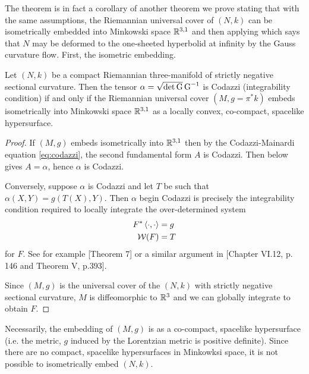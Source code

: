 \documentclass[a4paper, 12pt]{amsart}
\begin{document}
The theorem is in fact a corollary of another theorem we prove stating that with the same assumptions, the Riemannian universal cover of \((N, k)\) can be isometrically embedded into Minkowski space \(\mathbb{R}^{3,1}\) and then applying \cite[Theorem 1.1]{MR3344442} which says that \(N\) may be deformed to the one-sheeted hyperbolid at infinity by the Gauss curvature flow. First, the isometric embedding.

\begin{thm}
\label{thm:intg_embed}
Let \((N, k)\) be a compact Riemannian three-manifold of strictly negative sectional curvature. Then the tensor \(\alpha = \sqrt{\det \operatorname{G}} \operatorname{G}^{-1}\) is Codazzi (integrability condition) if and only if the Riemannian universal cover \((M, g = \pi^{\ast} k)\) embeds isometrically into Minkowski space \(\mathbb{R}^{3,1}\) as a locally convex, co-compact, spacelike hypersurface.
\end{thm}

\begin{proof}
If \((M, g)\) embeds isometrically into \(\mathbb{R}^{3,1}\) then by the Codazzi-Mainardi equation \eqref{eq:codazzi}, the second fundamental form \(A\) is Codazzi. Then  below gives \(A = \alpha\), hence \(\alpha\) is Codazzi.

Conversely, suppose \(\alpha\) is Codazzi and let \(T\) be such that \(\alpha(X, Y) = g(T(X), Y)\). Then \(\alpha\) begin Codazzi is precisely the integrability condition required to locally integrate the over-determined system
\begin{align*}
F^{\ast} \left\langle \cdot,\cdot \right\rangle &= g \\
\operatorname{\mathcal{W}}(F) &= T
\end{align*}
for \(F\). See for example \cite{MR1713298}[Theorem 7] or a similar argument in \cite{MR1013365}[Chapter VI.12, p. 146 and Theorem V, p.393].

Since \((M, g)\) is the universal cover of the \((N, k)\) with strictly negative sectional curvature, \(M\) is diffeomorphic to \(\mathbb{R}^3\) and we can globally integrate to obtain \(F\).
\end{proof}

\begin{rem}
Necessarily, the embedding of \((M, g)\) is as a co-compact, spacelike hypersurface (i.e. the metric, \(g\) induced by the Lorentzian metric is positive definite). Since there are no compact, spacelike hypersurfaces in Minkowksi space, it is not possible to isometrically embed \((N, k)\).
\end{rem}
\end{document}
